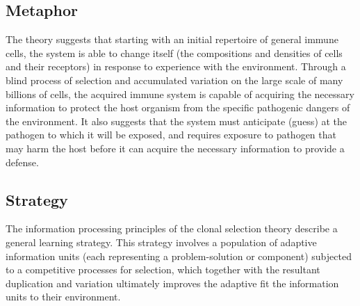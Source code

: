 \subsection{Metaphor}
The theory suggests that starting with an initial repertoire of general immune cells, the system is able to change itself (the compositions and densities of cells and their receptors) in response to experience with the environment. Through a blind process of selection and accumulated variation on the large scale of many billions of cells, the acquired immune system is capable of acquiring the necessary information to protect the host organism from the specific pathogenic dangers of the environment. It also suggests that the system must anticipate (guess) at the pathogen to which it will be exposed, and requires exposure to pathogen that may harm the host before it can acquire the necessary information to provide a defense.

\subsection{Strategy}
The information processing principles of the clonal selection theory describe a general learning strategy.
This strategy involves a population of adaptive information units (each representing a problem-solution or component) subjected to a competitive processes for selection, which together with the resultant duplication and variation ultimately improves the adaptive fit the information units to their environment.

